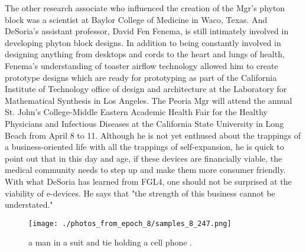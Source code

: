 \documentclass{article}%
\begin{document}
The other research associate who influenced the creation of the Mgr's phyton block was a scientist at Baylor College of Medicine in Waco, Texas. And DeSoria's assistant professor, David Fen Fenema, is still intimately involved in developing phyton block designs. In addition to being constantly involved in designing anything from desktops and cords to the heart and lungs of health, Fenema's understanding of toaster airflow technology allowed him to create prototype designs which are ready for prototyping as part of the California Institute of Technology office of design and architecture at the Laboratory for Mathematical Synthesis in Los Angeles.\newline%
The Peoria Mgr will attend the annual St. John's College{-}Middle Eastern Academic Health Fair for the Healthy Physicians and Infectious Diseases at the California State University in Long Beach from April 8 to 11. Although he is not yet enthused about the trappings of a business{-}oriented life with all the trappings of self{-}expansion, he is quick to point out that in this day and age, if these devices are financially viable, the medical community needs to step up and make them more consumer friendly.\newline%
With what DeSoria has learned from FGL4, one should not be surprised at the viability of e{-}devices. He says that "the strength of this business cannot be understated."\newline%

%


\begin{figure}[h!]%
\centering%
\texttt{[image: ./photos\_from\_epoch\_8/samples\_8\_247.png]}%
\caption{a man in a suit and tie holding a cell phone .}%
\end{figure}

%
\end{document}
